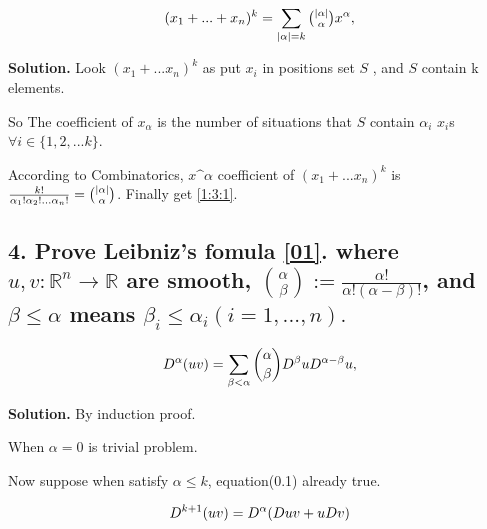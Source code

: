 \documentclass[a4paper]{book}
\newenvironment{solution}%
{\noindent\textbf{Solution.}}%
{\qedhere}
\numberwithin{equation}{chapter}
\theoremstyle{definition}
\begin{document}
\begin{multicols}{2}
\begin{equation}\label{1:3:1}
	(x_1 + ...+ x_n)^k = \sum_{|\alpha| = k} \tbinom{|\alpha|}{\alpha} x ^ \alpha ,
\end{equation}

\begin{solution}
	Look $	(x_1 + ... x_n)^k$ as put $x_i$ in positions set $S$ , and $S$ contain k elements.
	
	So The coefficient of $x_\alpha$ is the number of situations that $S$ contain $\alpha_i$ $x_i$s $\forall i \in \{1, 2, ... k\}$.
	
	According to Combinatorics, $x\^\alpha$ coefficient of  $	(x_1 + ... x_n)^k$ is
	$\frac{k!}{\alpha_1 ! \alpha_2 ! ... \alpha_n !} = \tbinom{|\alpha|}{\alpha}$. Finally get \ref{1:3:1}. 
\end{solution}

%

\subsection{4. Prove Leibniz's fomula \ref{01}. where $u,v:\mathbb{R}^n \rightarrow \mathbb{R} $ are smooth, $\binom{\alpha}{\beta} := \frac{\alpha!}{\alpha!(\alpha - \beta)!}$, and $\beta \leq \alpha $ means $\beta_{i} \leq \alpha_{i}  (i = 1,...,n).$}
\begin{large}
	\begin{equation}\label{01}
		\mathnormal{D}^\alpha (uv) = \sum_{\beta < \alpha}^{}\binom{\alpha}{\beta}
		\mathnormal{D}^\beta u \mathnormal{D}^{\alpha - \beta} u,
	\end{equation}
\end{large}

\begin{solution}
	By induction proof.
	
	When $\alpha = 0$ is trivial problem.
	
	Now suppose when satisfy $\alpha \leq k $, equation(0.1) already true.
	
	\begin{equation}
		\mathnormal{D}^{k+1} (uv) = \mathnormal{D}^\alpha (\mathnormal{D}uv + u\mathnormal{D}v) 
	\end{equation}
	

\end{solution}
\end{multicols}
\end{document}
